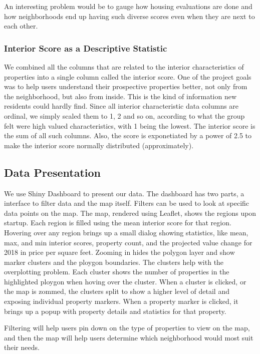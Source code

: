 \documentclass[12pt]{article}
\begin{document}
An interesting problem would be to gauge how housing evaluations are done 
and how neighborhoods end up having such diverse scores even when they
are next to each other.

\subsubsection{Interior Score as a Descriptive Statistic}

We combined all the columns that are related to the interior 
characteristics of properties into a single column called the interior 
score. One of the project goals was to help users understand their 
prospective properties better, not only from the neighborhood, but also
from inside. This is the kind of information new residents could hardly 
find. Since all interior characteristic data columns are ordinal, we 
simply scaled them to 1, 2 and so on, according to what the group felt
were high valued characteristics, with 1 being the lowest. The interior 
score is the sum of all such columns. Also, the score is exponetiated
by a power of 2.5 to make the interior score normally distributed 
(approximately).


\subsection{Data Presentation}

We use Shiny Dashboard \cite{ShinyDas50:online} to present our data. The 
dashboard has two parts, a interface to filter data and the map itself. 
Filters can be used to look at specific data points on the map. The map,
rendered using Leaflet, shows the regions upon startup. Each region is
filled using the mean interior score for that region. Hovering over any
region brings up a small dialog showing statistics, like mean, max, and
min interior scores, property count, and the projected value change for
2018 in price per square feet. Zooming in hides the polygon layer and
show marker clusters and the ploygon boundaries. The clusters help with
the overplotting problem. Each cluster shows the number of properties in
the highlighted ploygon when hoving over the cluster. When a cluster is
clicked, or the map is zommed, the clusters split to show a higher level
of detail and exposing individual property markers. When a property
marker is clicked, it brings up a popup with property details and
statistics for that property.

Filtering will help users pin down on the type of properties to view on
the map, and then the map will help users determine which neighborhood
would most suit their needs.
\end{document}
